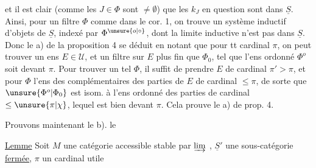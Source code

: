 
et  il est clair (comme les $J\in\Phi$ sont
$\ne\emptyset$) que  les $k_J$ en question sont dans
$\underline S$. Ainsi, pour un filtre $\Phi$ comme dans le cor. 1,
on trouve un système inductif d'objets de $\underline S$, indexé
par $\Phi^{\unsure{o|\circ}}$, dont la limite inductive n'est pas dans
$\underline S$. Donc le a) de la proposition 4 se déduit en notant
que pour tt cardinal $\pi$, on peut trouver
un ens $E\in\mathcal U$, et un filtre \inserted{$\Phi$} sur $E$ plus
fin que $\Phi_0$, tel que l'ens ordonné $\Phi^o$ soit 
devant $\pi$. Pour trouver un tel $\Phi$, il suffit de prendre $E$ de
cardinal $\pi'>\pi$, et pour $\Phi$ l'ens des complémentaires des
parties de $E$ de cardinal $\leq\pi$, de sorte que
$\unsure{\Phi^o|\Phi_0}$ est isom. à l'ens ordonné des
 parties  de cardinal
$\leq\unsure{\pi|\chi}$, lequel est bien  devant $\pi$.
Cela prouve  le a) de prop. 4.

Prouvons maintenant le b).  le

\uline{Lemme} Soit $M$ une catégorie accessible stable par
$\varinjlim$ 
,
$\underline S'$ une sous-catégorie \uline{fermée}, $\pi$ un cardinal utile

